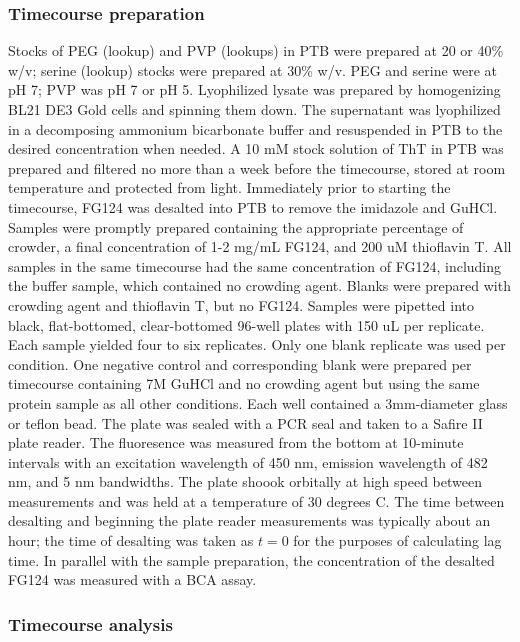 \subsubsection{Timecourse preparation} Stocks of PEG (lookup) and PVP (lookups) in PTB were prepared at 20 or 40\% w/v; serine (lookup) stocks were prepared at 30\% w/v.  PEG and serine were at pH 7; PVP was pH 7 or pH 5.  Lyophilized lysate was prepared by homogenizing BL21 DE3 Gold cells and spinning them down.  The supernatant was lyophilized in a decomposing ammonium bicarbonate buffer and resuspended in PTB to the desired concentration when needed.  A 10 mM stock solution of ThT in PTB was prepared and filtered no more than a week before the timecourse, stored at room temperature and protected from light.  Immediately prior to starting the timecourse, FG124 was desalted into PTB to remove the imidazole and GuHCl.  Samples were promptly prepared containing the appropriate percentage of crowder, a final concentration of 1-2 mg/mL FG124, and 200 uM thioflavin T.  All samples in the same timecourse had the same concentration of FG124, including the buffer sample, which contained no crowding agent.  Blanks were prepared with crowding agent and thioflavin T, but no FG124.  Samples were pipetted into black, flat-bottomed, clear-bottomed 96-well plates with 150 uL per replicate.  Each sample yielded four to six replicates.  Only one blank replicate was used per condition.  One negative control and corresponding blank were prepared per timecourse containing 7M GuHCl and no crowding agent but using the same protein sample as all other conditions.  Each well contained a 3mm-diameter glass or teflon bead.  The plate was sealed with a PCR seal and taken to a Safire II plate reader.  The fluoresence was measured from the bottom at 10-minute intervals with an excitation wavelength of 450 nm, emission wavelength of 482 nm, and 5 nm bandwidths.  The plate shoook orbitally at high speed between measurements and was held at a temperature of 30 degrees C.  The time between desalting and beginning the plate reader measurements was typically about an hour; the time of desalting was taken as $t=0$ for the purposes of calculating lag time. In parallel with the sample preparation, the concentration of the desalted FG124 was measured with a BCA assay.

\subsubsection{Timecourse analysis}


